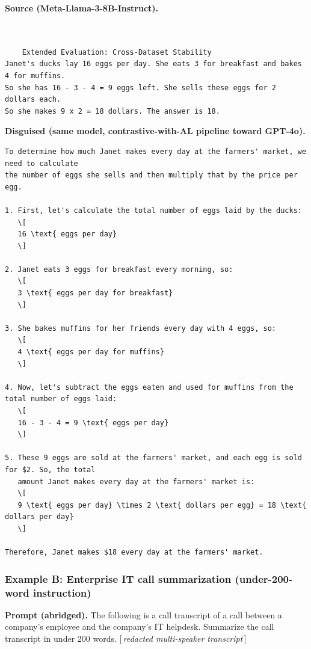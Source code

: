 \documentclass{article}
\begin{document}
\textbf{Source (Meta-Llama-3-8B-Instruct).}
\begin{small}
\begin{verbatim}


    Extended Evaluation: Cross-Dataset Stability
Janet's ducks lay 16 eggs per day. She eats 3 for breakfast and bakes 4 for muffins.
So she has 16 - 3 - 4 = 9 eggs left. She sells these eggs for 2 dollars each.
So she makes 9 x 2 = 18 dollars. The answer is 18.
\end{verbatim}
\end{small}

\textbf{Disguised (same model, contrastive-with-AL pipeline toward GPT-4o).}
\begin{small}
\begin{verbatim}
To determine how much Janet makes every day at the farmers' market, we need to calculate
the number of eggs she sells and then multiply that by the price per egg.

1. First, let's calculate the total number of eggs laid by the ducks:
   \[
   16 \text{ eggs per day}
   \]

2. Janet eats 3 eggs for breakfast every morning, so:
   \[
   3 \text{ eggs per day for breakfast}
   \]

3. She bakes muffins for her friends every day with 4 eggs, so:
   \[
   4 \text{ eggs per day for muffins}
   \]

4. Now, let's subtract the eggs eaten and used for muffins from the total number of eggs laid:
   \[
   16 - 3 - 4 = 9 \text{ eggs per day}
   \]

5. These 9 eggs are sold at the farmers' market, and each egg is sold for $2. So, the total
   amount Janet makes every day at the farmers' market is:
   \[
   9 \text{ eggs per day} \times 2 \text{ dollars per egg} = 18 \text{ dollars per day}
   \]

Therefore, Janet makes $18 every day at the farmers' market.
\end{verbatim}
\end{small}
\subsubsection*{Example B: Enterprise IT call summarization (under-200-word instruction)}
\textbf{Prompt (abridged).}
The following is a call transcript of a call between a company's employee and the company's IT helpdesk. Summarize the call transcript in under 200 words. [\,\textit{redacted multi-speaker transcript}\,]
\end{document}
